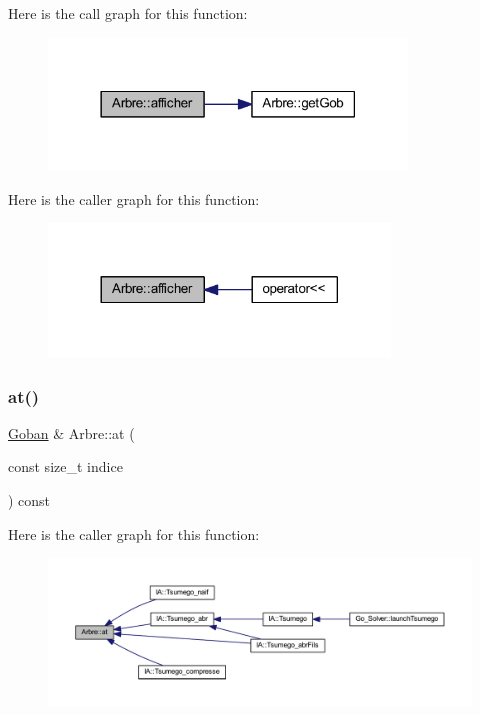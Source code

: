 Here is the call graph for this function\+:
\nopagebreak
\begin{figure}[H]
\begin{center}
\leavevmode
\includegraphics[width=270pt]{class_arbre_a970de955ffdbbd5894e0fa0c40c4e69e_cgraph}
\end{center}
\end{figure}
Here is the caller graph for this function\+:
\nopagebreak
\begin{figure}[H]
\begin{center}
\leavevmode
\includegraphics[width=257pt]{class_arbre_a970de955ffdbbd5894e0fa0c40c4e69e_icgraph}
\end{center}
\end{figure}
\mbox{\label{class_arbre_ab8761bfdaadb8d6846199f269c6bbbc4}} 
\subsubsection{\texorpdfstring{at()}{at()}}
{\footnotesize\ttfamily \hyperlink{class_goban}{Goban} \& Arbre\+::at (\begin{DoxyParamCaption}\item[{const size\+\_\+t}]{indice }\end{DoxyParamCaption}) const}

Here is the caller graph for this function\+:
\nopagebreak
\begin{figure}[H]
\begin{center}
\leavevmode
\includegraphics[width=350pt]{class_arbre_ab8761bfdaadb8d6846199f269c6bbbc4_icgraph}
\end{center}
\end{figure}
\mbox{\label{class_arbre_afecc9a49515e88dba06b10d1e0fadb76}} 
